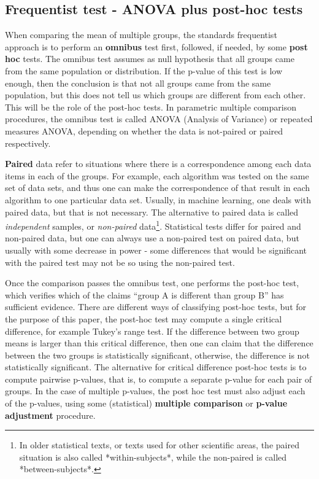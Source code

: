 \documentclass[twoside,11pt,preprint]{article}
\begin{document}
\hypertarget{frequentist-test---anova-plus-post-hoc-tests}{%
\subsection{\texorpdfstring{Frequentist test - ANOVA plus post-hoc tests \label{sec:tut2}}{Frequentist test - ANOVA plus post-hoc tests }}\label{frequentist-test---anova-plus-post-hoc-tests}}

When comparing the mean of multiple groups, the standards frequentist
approach is to perform an \textbf{omnibus} test first, followed, if needed,
by some \textbf{post hoc} tests. The omnibus test assumes as null
hypothesis that all groups came from the same population or
distribution. If the p-value of this test is low enough, then the
conclusion is that not all groups came from the same population, but
this does not tell us which groups are different from each other. This
will be the role of the post-hoc tests. In parametric multiple
comparison procedures, the omnibus test is called ANOVA (Analysis of
Variance) or repeated measures ANOVA, depending on whether the data is
not-paired or paired respectively.

\textbf{Paired} data refer to situations where there is a correspondence
among each data items in each of the groups. For example, each
algorithm was tested on the same set of data sets, and thus one can
make the correspondence of that result in each algorithm to one
particular data set. Usually, in machine learning, one deals with
paired data, but that is not necessary. The alternative to paired data
is called \emph{independent} samples, or \emph{non-paired} data\footnote{In
older statistical texts, or texts used for other scientific areas, the
paired situation is also called *within-subjects*, while the non-paired
is called *between-subjects*.}. Statistical tests differ for paired and
non-paired data, but one can always use a non-paired test on paired
data, but usually with some decrease in power - some differences that
would be significant with the paired test may not be so using the
non-paired test.

Once the comparison passes the omnibus test, one performs the post-hoc
test, which verifies which of the claims ``group A is different than
group B'' has sufficient evidence. There are different ways of
classifying post-hoc tests, but for the purpose of this paper, the
post-hoc test may compute a single critical difference, for example
Tukey's range test. If the difference between two group means is
larger than this critical difference, then one can claim that the
difference between the two groups is statistically significant,
otherwise, the difference is not statistically significant. The
alternative for critical difference post-hoc tests is to compute pairwise p-values, that
is, to compute a separate p-value for each pair of groups. In the
case of multiple p-values, the post hoc test must also adjust each of
the p-values, using some (statistical) \textbf{multiple comparison} or
\textbf{p-value adjustment} procedure.
\end{document}
